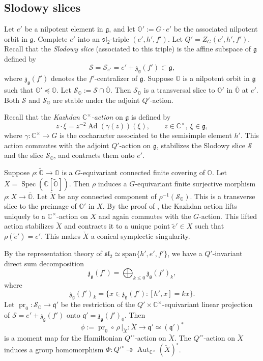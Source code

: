 \documentclass[11pt, a4paper]{amsart}
\newcommand{\C}{\mathbb{C}}
\newcommand{\g}{\mathfrak{g}}
\newcommand{\orb}{\mathbb{O}}
\newcommand{\fg}{\mathfrak{g}}
\newcommand{\cS}{\mathcal{S}}
\DeclareMathOperator{\Ad}{Ad}
\newcommand{\q}{\mathfrak{q}}
\newcommand{\pr}{\operatorname{pr}}
\newcommand{\cm}{\C^\times}
\newcommand{\spec}{\operatorname{Spec}}
\newcommand{\slf}{\mathfrak{sl}}
\newcommand{\aut}{{\operatorname{Aut}}}
\theoremstyle{definition}
\numberwithin{equation}{section}
\begin{document}
\subsection{Slodowy slices} \label{subsec:Slodowy}

Let $e'$ be a nilpotent element in $\g$, and let $\orb' := G \cdot e'$ be the associated nilpotent orbit in $\g$. Complete $e'$ into an $\slf_2$-triple $(e',h',f')$. Let $Q' = Z_G(e',h',f')$. Recall that the \emph{Slodowy slice} (associated to this triple) is the affine subspace of $\g$ defined by
	\[ \cS = \cS_{e'} = e' + \mathfrak{z}_{\g}(f') \subset \g,\] 
where $\mathfrak{z}_{\g}(f')$ denotes the $f'$-centralizer of $\g$.
Suppose $\orb$ is a nilpotent orbit in $\g$ such that $\orb' \preceq \orb$. Let $\cS_\orb := \cS \cap \overline{\orb}$. Then $\cS_\orb$ is a transversal slice to $\orb'$ in $\overline{\orb}$ at $e'$. Both $\cS$ and $\cS_\orb$ are stable under the adjoint $Q'$-action.

Recall that the \emph{Kazhdan $\cm$-action} on $\fg$ is defined by 
%
\begin{equation}\label{eq:Kazhdan}
	z \cdot \xi = z^{-2} \Ad(\gamma(z))(\xi), \qquad z \in \cm, \ \xi \in \fg, 
\end{equation}
%
where $\gamma: \cm \to G$ is the cocharacter associated to the semisimple element $h'$. This action commutes with the adjoint $Q'$-action on $\g$, stabilizes the Slodowy slice $\cS$ and the slice $\cS_\orb$, and contracts them onto $e'$. 

Suppose $\rho: \widetilde{\orb} \to \orb$ is a $G$-equivariant connected finite covering of $\orb$. Let $X = \spec(\C[\widetilde{\orb}])$. Then $\rho$ induces a $G$-equivariant finite surjective morphism $\rho: X \to \overline{\orb}$. Let $\check{X}$ be any connected component of $\rho^{-1}(\cS_\orb)$. This is a transverse slice to the preimage of $\orb'$ in $X$.  
By the proof of \cite[Proposition 5.12]{MBMY}, the Kazhdan action lifts uniquely to a $\cm$-action on $X$ and again commutes with the $G$-action. This lifted action stabilizes $\check{X}$ and contracts it to a unique point $\tilde{e}' \in X$ such that $\rho(\tilde{e}') = e'$. This makes $\check{X}$ a conical symplectic singularity.

By the representation theory of $\slf_2 \simeq \mathrm{span}\{h',e',f'\}$, we have a $Q'$-invariant direct sum decomposition 
\begin{equation} \label{eq:zf_decomp}
	\mathfrak{z}_{\g}(f') = \bigoplus_{k \leqslant 0} \mathfrak{z}_{\g}(f')_k,
\end{equation}
where
\[
\mathfrak{z}_{\g}(f')_k = \{ x \in \mathfrak{z}_{\g}(f') : [h',x] = kx\}.
\] 
Let $\pr_0: \cS_\orb \to \mathfrak{q}'$ be the restriction of the 
$Q' \times \cm$-equivariant linear projection of $\cS = e' + \mathfrak{z}_{\g}(f')$ onto $\mathfrak{q}' = \mathfrak{z}_{\g}(f')_0$. Then 
	\[\phi := \pr_0 \circ \, \rho\,|_{\check{X}} : \check{X} \to \q' \simeq (\q')^*\] 
is a moment map for the Hamiltonian $Q'^\circ$-action on $\check{X}$. The $Q'^\circ$-action on $\check{X}$ induces a group homomorphism $\Phi: Q'^\circ \twoheadrightarrow \aut_{\cm}(\check{X})^\circ$. 
\end{document}
